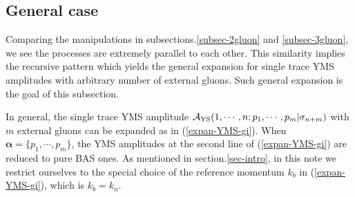 \documentclass[11pt,a4paper]{article}
\def\eref#1{(\ref{#1})}
\def\a{{\alpha}}
\begin{document}
\subsection{General case}
\label{subsec-general}

Comparing the manipulations in subsections.\ref{subsec-2gluon} and \ref{subsec-3gluon}, we see the processes are extremely parallel to each other. This similarity implies the recursive pattern which yields the general expansion for single trace YMS amplitudes with arbitrary number of external gluons. Such general expansion is the goal of this subsection.

In general, the single trace YMS amplitude ${\cal A}_{\rm YS}(1,\cdots,n;p_1,\cdots,p_m|\sigma_{n+m})$ with $m$ external gluons can be expanded as
in \eref{expan-YMS-gi}. When $\pmb{\a}=\{p_1,\cdots,p_m\}$, the YMS amplitudes at the second line of \eref{expan-YMS-gi} are reduced to pure BAS ones. As mentioned in section.\ref{sec-intro}, in this note we restrict ourselves to the special choice of the reference momentum $k_b$ in \eref{expan-YMS-gi}, which is $k_b=k_n$.
\end{document}
